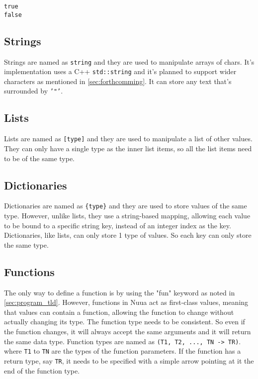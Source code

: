 \begin{lstlisting}
true
false
\end{lstlisting}

\subsection{Strings}

Strings are named as \texttt{string} and they are used to manipulate arrays of chars. It's implementation uses
a C++ \texttt{std::string} and it's planned to support wider characters as mentioned in \autoref{sec:forthcomming}. It can store any text that's surrounded by \texttt{'"'}.

\subsection{Lists}

Lists are named as \texttt{[type]} and they are used to manipulate a list of other values. They can only have a single
type as the inner list items, so all the list items need to be of the same type.

\subsection{Dictionaries}

Dictionaries are named as \texttt{\{type\}} and they are used to store values of the same type. However, unlike lists, they
use a string-based mapping, allowing each value to be bound to a specific string key, instead of an integer index as the key.
Dictionaries, like lists, can only store 1 type of values. So each key can only store the same type.

\subsection{Functions}

The only way to define a function is by using the "fun" keyword as noted in \autoref{sec:program_tld}. However, functions in Nuua
act as first-class values, meaning that values can contain a function, allowing the function to change without actually changing its type.
The function type needs to be consistent. So even if the function changes, it will always accept the same arguments and it will return the same data type.
Function types are named as \texttt{(T1, T2, ..., TN -> TR)}. where \texttt{T1} to \texttt{TN} are the types of the function parameters.
If the function has a return type, say \texttt{TR}, it needs to be specified with a simple arrow pointing at it the end of the function type.

